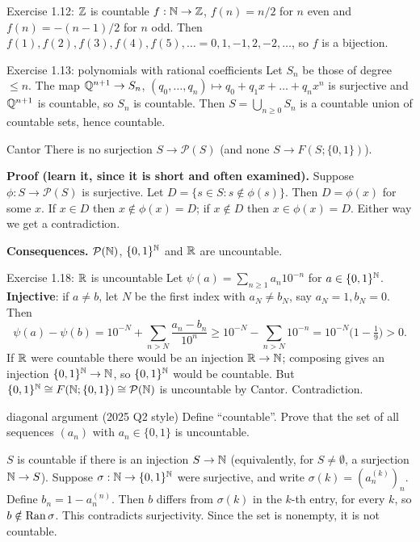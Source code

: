 \begin{example}{Exercise 1.12: $\mathbb Z$ is countable}
$f:\mathbb N\to\mathbb Z$, $f(n)=n/2$ for $n$ even and $f(n)=-(n-1)/2$ for $n$ odd. Then
$f(1),f(2),f(3),f(4),f(5),\dots=0,1,-1,2,-2,\dots$, so $f$ is a bijection.
\end{example}

\begin{example}{Exercise 1.13: polynomials with rational coefficients}
Let $S_n$ be those of degree $\le n$. The map $\mathbb Q^{n+1}\to S_n$,
$(q_0,\dots,q_n)\mapsto q_0+q_1x+\dots+q_nx^n$ is surjective and $\mathbb Q^{n+1}$ is countable, so
$S_n$ is countable. Then $S=\bigcup_{n\ge0}S_n$ is a countable union of countable sets, hence
countable.
\end{example}

\begin{thm}{Cantor}
There is no surjection $S\to\mathcal P(S)$ (and none $S\to F(S;\{0,1\})$).
\end{thm}
\begin{answer}
\textbf{Proof (learn it, since it is short and often examined).} Suppose $\phi:S\to\mathcal P(S)$
is surjective. Let $D=\{s\in S: s\notin\phi(s)\}$. Then $D=\phi(x)$ for some $x$. If $x\in D$
then $x\notin\phi(x)=D$; if $x\notin D$ then $x\in\phi(x)=D$. Either way we get a contradiction.
\end{answer}

\textbf{Consequences.} $\mathcal P(\mathbb N)$, $\{0,1\}^\mathbb N$ and $\mathbb R$ are uncountable.

\begin{example}{Exercise 1.18: $\mathbb R$ is uncountable}
Let $\psi(a)=\sum_{n\ge1}a_n10^{-n}$ for $a\in\{0,1\}^\mathbb N$. \textbf{Injective}: if $a\ne b$, let
$N$ be the first index with $a_N\ne b_N$, say $a_N=1,b_N=0$. Then
\[\psi(a)-\psi(b)=10^{-N}+\sum_{n>N}\frac{a_n-b_n}{10^n}\ge10^{-N}-\sum_{n>N}10^{-n}
=10^{-N}\big(1-\tfrac19\big)>0.\]
If $\mathbb R$ were countable there would be an injection $\mathbb R\to\mathbb N$; composing gives an injection
$\{0,1\}^\mathbb N\to\mathbb N$, so $\{0,1\}^\mathbb N$ would be countable. But $\{0,1\}^\mathbb N\cong F(\mathbb N;\{0,1\})\cong
\mathcal P(\mathbb N)$ is uncountable by Cantor. Contradiction.
\end{example}

\begin{exam}{diagonal argument (2025 Q2 style)}
Define ``countable''. Prove that the set of all sequences $(a_n)$ with $a_n\in\{0,1\}$ is
uncountable.
\end{exam}
\begin{answer}
$S$ is countable if there is an injection $S\to\mathbb N$ (equivalently, for $S\ne\emptyset$, a
surjection $\mathbb N\to S$). Suppose $\sigma:\mathbb N\to\{0,1\}^\mathbb N$ were surjective, and write
$\sigma(k)=(a^{(k)}_n)_n$. Define $b_n=1-a^{(n)}_n$. Then $b$ differs from $\sigma(k)$ in the
$k$-th entry, for every $k$, so $b\notin\operatorname{Ran}\sigma$. This contradicts surjectivity. Since the set
is nonempty, it is not countable.
\end{answer}

